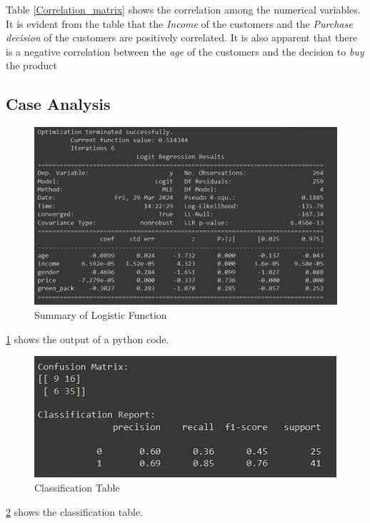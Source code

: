 \documentclass[a4paper,10pt]{article}
\begin{document}
Table \ref{Correlation_matrix} shows the correlation among the numerical variables. It is evident from the table that the \textit{Income} of the customers and the \textit{Purchase decision} of the customers are positively correlated. 
It is also apparent that there is a negative correlation between the \textit{age} of the customers and the decision to \textit{buy} the product



\subsection{Case Analysis}


\begin{figure}[ht]
\centering
\includegraphics[height=6.6cm]{figures/coeff.png}
\caption{Summary of Logistic Function}
\label{fig_regression}
\label{summary_lr}
\end{figure}

\ref{summary_lr} shows the output of a python code. 




\begin{figure}[ht]
\centering
\includegraphics[height=4.5cm]{figures/class_table.png}
\caption{Classification Table}
\label{class_tab}
\end{figure}

\ref{class_tab} shows the classification table. %
\end{document}
